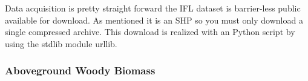 			Data acquisition is pretty straight forward the \ac{IFL} dataset is barrier-less public available for download. As mentioned it is an \ac{SHP} so you must only download a single compressed archive. This download is realized with an Python script by using the \ac{stdlib} module urllib.

		\subsubsection{Aboveground Woody Biomass}
			
			
